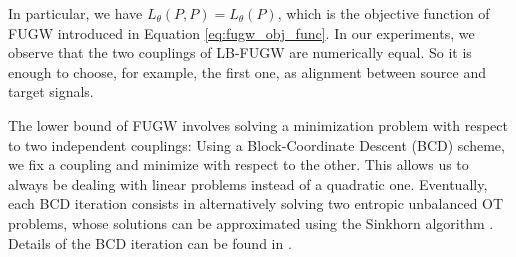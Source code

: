 In particular, we have $L_{\theta}(P, P) = L_{\theta}(P)$,
which is the objective function of FUGW introduced in Equation \eqref{eq:fugw_obj_func}.
In our experiments, we observe that the two couplings of LB-FUGW are numerically equal.
So it is enough to choose, for example, the first one, as alignment between source and target signals.

The lower bound of FUGW involves solving a minimization problem with respect to two independent couplings:
Using a Block-Coordinate Descent (BCD) scheme, we fix a coupling and minimize
with respect to the other. This allows us to always be dealing with linear problems
instead of a quadratic one. Eventually, each BCD iteration consists in alternatively solving
two entropic unbalanced OT problems, whose solutions can be approximated using
the Sinkhorn algorithm \citep{Sejourne19}. Details of the BCD iteration can be found
in .


